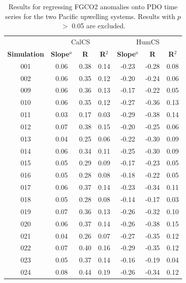\documentclass[12pt]{article}
\begin{document}
\newpage
\begin{table}[!h]
	\centering
	\caption{Results for regressing FGCO2 anomalies onto PDO time series for the two Pacific upwelling systems. Results with $p$ $>$ 0.05 are excluded.}
	\begin{tabular}{c c c c | c c c}
		& \multicolumn{3}{c}{CalCS} & \multicolumn{3}{c}{HumCS} \\
		\cmidrule{2-4}\cmidrule{5-7}
		\textbf{Simulation} &  \textbf{Slope}$^{a}$  &  \textbf{R} &  \textbf{R$^{2}$} &  \textbf{Slope}$^{a}$  &  \textbf{R} &  \textbf{R$^{2}$}  \\
		\midrule
		001 &   0.06 &     0.38 &       0.14 &  -0.23 &    -0.28 &       0.08 \\
		002 &   0.06 &     0.35 &       0.12 &  -0.20 &    -0.24 &       0.06 \\
		009 &   0.06 &     0.36 &       0.13 &  -0.17 &    -0.22 &       0.05 \\
		010 &   0.06 &     0.35 &       0.12 &  -0.27 &    -0.36 &       0.13 \\
		011 &   0.03 &     0.17 &       0.03 &  -0.29 &    -0.38 &       0.14 \\
		012 &   0.07 &     0.38 &       0.15 &  -0.20 &    -0.25 &       0.06 \\
		013 &   0.04 &     0.25 &       0.06 &  -0.22 &    -0.30 &       0.09 \\
		014 &   0.06 &     0.34 &       0.11 &  -0.25 &    -0.30 &       0.09 \\
		015 &   0.05 &     0.29 &       0.09 &  -0.17 &    -0.23 &       0.05 \\
		016 &   0.05 &     0.28 &       0.08 &  -0.18 &    -0.22 &       0.05 \\
		017 &   0.06 &     0.37 &       0.14 &  -0.23 &    -0.34 &       0.11 \\
		018 &   0.05 &     0.28 &       0.08 &  -0.14 &    -0.17 &       0.03 \\
		019 &   0.07 &     0.36 &       0.13 &  -0.26 &    -0.32 &       0.10 \\
		020 &   0.06 &     0.37 &       0.14 &  -0.26 &    -0.38 &       0.15 \\
		021 &   0.04 &     0.26 &       0.07 &  -0.27 &    -0.35 &       0.12 \\
		022 &   0.07 &     0.40 &       0.16 &  -0.29 &    -0.35 &       0.12 \\
		023 &   0.05 &     0.37 &       0.14 &  -0.16 &    -0.19 &       0.04 \\
		024 &   0.08 &     0.44 &       0.19 &  -0.26 &    -0.34 &       0.12 \\

\end{tabular}
\end{table}
\end{document}
